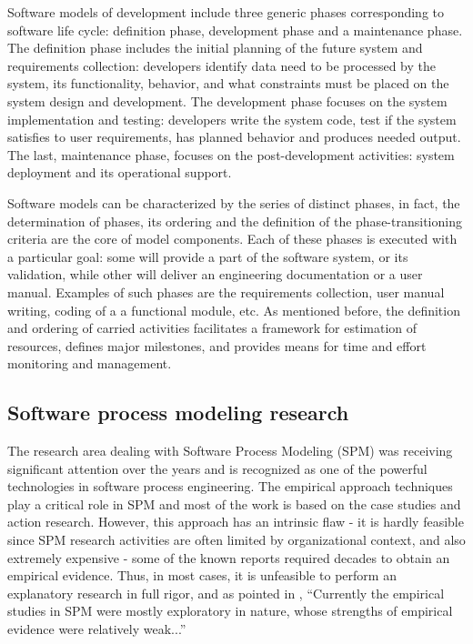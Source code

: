 Software models of development include three generic phases corresponding to software
life cycle: definition phase, development phase and a maintenance phase. 
The definition phase includes the initial planning of the future system and 
requirements collection: developers identify data need to be processed by the system, 
its functionality, behavior, and what constraints must be placed on the system design 
and development. 
The development phase focuses on the system implementation and testing: developers 
write the system code, test if the system satisfies to user requirements, 
has planned behavior and produces needed output. 
The last, maintenance phase, focuses on the post-development activities: 
system deployment and its operational support. 

Software models can be characterized by the series of distinct phases, in fact, the 
determination of phases, its ordering and the definition of the phase-transitioning 
criteria are the core of model components.
Each of these phases is executed with a particular goal: some will provide a part of the 
software system, or its validation, while other will deliver an engineering documentation 
or a user manual. Examples of such phases are the requirements collection, 
user manual writing, coding of a a functional module, etc.
As mentioned before, the definition and ordering of carried activities facilitates
a framework for estimation of resources, defines major milestones, and provides 
means for time and effort monitoring and management. 

\subsection{Software process modeling research}
The research area dealing with Software Process Modeling (SPM) was receiving significant 
attention over the years and is recognized as one of the powerful technologies
in software process engineering. The empirical approach techniques play a critical role
in SPM and most of the work is based on the case studies and action research. 
However, this approach has an intrinsic flaw - it is hardly feasible since
SPM research activities are often limited by organizational context, and also extremely 
expensive - some of the known reports required decades to obtain an empirical evidence.
Thus, in most cases, it is unfeasible to perform an explanatory research in full rigor,
and as pointed in \cite{citeulike:11079867}, ``Currently the empirical studies in SPM were 
mostly exploratory in nature, whose strengths of empirical evidence were relatively weak...''

